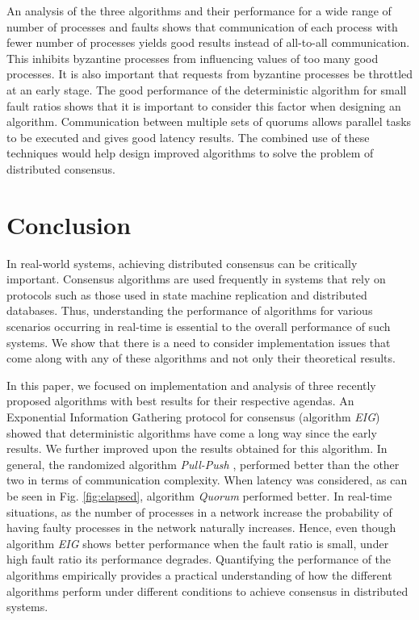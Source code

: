 An analysis of the three algorithms and their performance for a wide range of
number of processes and faults shows that communication of each process with
fewer number of processes yields good results instead of all-to-all
communication. This inhibits byzantine processes from influencing values of too
many good processes. It is also important that requests from byzantine
processes be throttled at an early stage. The good performance of the
deterministic algorithm for small fault ratios shows that it is important to
consider this factor when designing an algorithm.  Communication between
multiple sets of quorums allows parallel tasks to be executed and gives good
latency results. The combined use of these techniques would help design
improved algorithms to solve the problem of distributed consensus. 



\section{Conclusion} \label{sec:conc} In real-world systems, achieving
distributed consensus can be critically important. Consensus algorithms are
used frequently in systems that rely on protocols such as those used in state
machine replication and distributed databases. Thus, understanding the
performance of algorithms for various scenarios occurring in real-time is
essential to the overall performance of such systems. We show that there is
a need to consider implementation issues that come along with any of these
algorithms and not only their theoretical results. 

In this paper, we focused on implementation and analysis of three recently
proposed algorithms with best results for their respective agendas. An
Exponential Information Gathering protocol for consensus \cite{KM13} (algorithm
\textit{EIG}) showed that deterministic algorithms have come a long way since
the early results. We further improved upon the results obtained for this
algorithm. In general, the randomized algorithm \textit{Pull-Push}
\cite{BGH13}, performed better than the other two in terms of communication
complexity. When latency was considered, as can be seen in Fig.
\ref{fig:elapsed}, algorithm \textit{Quorum} \cite{BPV06} performed better. In
real-time situations, as the number of processes in a network increase the
probability of having faulty processes in the network naturally increases.
Hence, even though algorithm \textit{EIG} shows better performance when the
fault ratio is small, under high fault ratio its performance degrades.
Quantifying the performance of the algorithms empirically provides a practical
understanding of how the different algorithms perform under different
conditions to achieve consensus in distributed systems.


